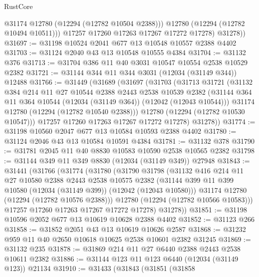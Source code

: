 \begin{lexlean}{RustCore}
\begin{coremodule}
              @31174
              @12780
              (@12294 (@12782 @10504 @2388)))
            @12780
            (@12294 (@12782 @10494 @10511)))
          @17257
          @17260
          @17263
          @17267
          @17272
          @17278)
        @31278))
@31697 := @31198 @10524 @2041 @677 @13 @10548 @10557 @2388 @4402
@31703 := @31124 @2040 @43 @13 @10548 @10555 @4384
@31704 := @31132 @376
@31713 := @31704 @386 @11 @40 @3031 @10547 @10554 @2538 @10529 @2382
@31721 := @31144 @344 @11 @344 @3031 (@12034 (@31149 @344)) @12488
@31766 := @31449
    (@31689
      (@31697
        (@31703
          (@31713
            @31721
            (@31132
              @384
              @214
              @11
              @27
              @10544
              @2388
              @2443
              @2538
              @10539
              @2382
              (@31144 @364 @11 @364 @10544 (@12034 (@31149 @364)) (@12042 (@12043 @10544)))
              @31174
              @12780
              (@12294 (@12782 @10540 @2388)))
            @12780
            (@12294 (@12782 @10530 @10547)))
          @17257
          @17260
          @17263
          @17267
          @17272
          @17278)
        @31278))
@31774 := @31198 @10560 @2047 @677 @13 @10584 @10593 @2388 @4402
@31780 := @31124 @2046 @43 @13 @10584 @10591 @4384
@31781 := @31132 @378
@31790 := @31781 @2045 @11 @40 @8830 @10583 @10590 @2538 @10565 @2382
@31798 := @31144 @349 @11 @349 @8830 (@12034 (@31149 @349)) @27948
@31843 := @31441
    (@31766
      (@31774
        (@31780
          (@31790
            @31798
            (@31132
              @416
              @214
              @11
              @27
              @10580
              @2388
              @2443
              @2538
              @10575
              @2382
              (@31144 @399 @11 @399 @10580 (@12034 (@31149 @399)) (@12042 (@12043 @10580)))
              @31174
              @12780
              (@12294 (@12782 @10576 @2388)))
            @12780
            (@12294 (@12782 @10566 @10583)))
          @17257
          @17260
          @17263
          @17267
          @17272
          @17278)
        @31278))
@31851 := @31198 @10596 @2052 @677 @13 @10619 @10628 @2388 @4402
@31852 := @31123 @266
@31858 := @31852 @2051 @43 @13 @10619 @10626 @2587
@31868 := @31232 @959 @11 @40 @2650 @10618 @10625 @2538 @10601 @2382 @31245
@31869 := @31132 @235
@31878 := @31869 @214 @11 @27 @6440 @2388 @2443 @2538 @10611 @2382
@31886 := @31144 @123 @11 @123 @6440 (@12034 (@31149 @123)) @21134
@31910 := @31433
    (@31843
      (@31851
        (@31858

\end{coremodule}
\end{lexlean}
